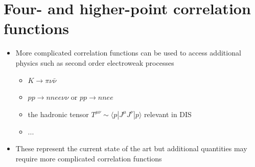 \section{Four- and higher-point correlation functions}

\begin{itemize}
    \item More complicated correlation functions can be used to access additional physics such as second order electroweak processes
    \begin{itemize}
        \item $K \to \pi \nu \bar{\nu}$
        \item $p p \to n n e e \nu \nu$ or $p p \to n n e e$
        \item the hadronic tensor $T^{\mu \nu} \sim \langle p | J^\mu J^\nu | p \rangle$ relevant in DIS
        \item ...
    \end{itemize}
    \item These represent the current state of the art but additional quantities may require more complicated correlation functions 
\end{itemize}

